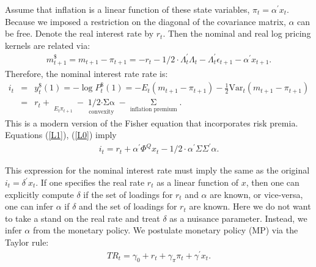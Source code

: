\documentclass[11pt]{article}
\def\stackunder#1#2{\mathrel{\mathop{#2}\limits_{#1}}}
\begin{document}
Assume that inflation is a linear function of these state variables, $\pi_t=\alpha^{\prime} x_t.$ Because we imposed a restriction on the diagonal of the covariance matrix, $\alpha$ can be free.  Denote the real interest rate by $r_t.$ Then the nominal and real log pricing kernels are related via:
\begin{eqnarray}
    m_{t+1}^{\$}=m_{t+1} - \pi_{t+1} = - r_t - 1/2 \cdot \Lambda_t^{\prime} \Lambda_t - \Lambda_t^{\prime} \epsilon_{t+1} - \alpha^{\prime} x_{t+1}.
\end{eqnarray}
Therefore, the nominal interest rate rate is:
\begin{eqnarray}
    i_t&=&y^{\$}_t(1)=-\log P^{\$}_t(1) = -E_t(m_{t+1}-\pi_{t+1})-\frac{1}{2}\mbox{Var}_t(m_{t+1}-\pi_{t+1})\nonumber \\
    &=&r_t+\stackunder{E_t{\pi_{t+1}}}{\alpha^{\prime}\left(\mu+\Phi x_t \right)} -\stackunder{\mbox{convexity}}{1/2\cdot  \alpha^{\prime} \Sigma \Sigma^{\prime} \alpha} - \stackunder{\mbox{inflation premium}}{\alpha^{\prime} \Sigma \Lambda_t}.
\end{eqnarray}
This is a modern version of the Fisher equation that incorporates risk premia. Equations (\ref{L1}), (\ref{L0}) imply
\begin{eqnarray}
    i_t=r_t+\alpha^{\prime}\Phi^Q x_t  -1/2\cdot  \alpha^{\prime} \Sigma \Sigma^{\prime} \alpha.
\end{eqnarray}

This expression for the nominal interest rate must imply the same as the original $i_t=\delta^{'}x_t.$ If one specifies the real rate $r_t$ as a linear function of $x$, then one can explicitly compute $\delta$ if the set of loadings for $r_t$ and $\alpha$ are known, or vice-versa, one can infer $\alpha$ if $\delta$ and the set of loadings for $r_t$ are known. Here we do not want to take a stand on the real rate and treat $\delta$ as a nuisance parameter. Instead, we infer $\alpha$ from the monetary policy. We postulate monetary policy (MP) via the Taylor rule:
\begin{eqnarray}
      TR_t = \gamma_0 + r_t + \gamma_{\pi} \pi_t + \gamma^{\prime} x_t.
\end{eqnarray}
\end{document}
